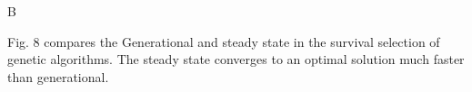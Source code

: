 \documentclass[conference]{IEEEtran}
\begin{document}
\vspace{2em}

B
\begin{figure}[!ht]

\centering{}

\caption{}
\label{fig:cnnj}
\end{figure}
\par
\noindent
Fig. 8 compares the Generational and steady state in the survival selection of genetic algorithms. The steady state converges to an optimal solution much faster than generational.
\end{document}
